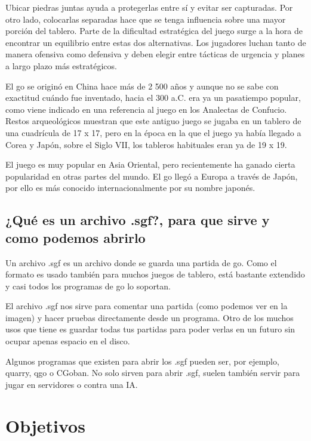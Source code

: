 \documentclass[12pt,a4paper]{report}
\begin{document}
Ubicar piedras juntas ayuda a protegerlas entre sí y evitar ser capturadas. Por
otro lado, colocarlas separadas hace que se tenga influencia sobre una mayor
porción del tablero. Parte de la dificultad estratégica del juego surge a la
hora de encontrar un equilibrio entre estas dos alternativas. Los jugadores
luchan tanto de manera ofensiva como defensiva y deben elegir entre tácticas de
urgencia y planes a largo plazo más estratégicos.

El go se originó en China hace más de 2 500 años y aunque no se sabe con
exactitud cuándo fue inventado, hacia el 300 a.C. era ya un pasatiempo popular,
como viene indicado en una referencia al juego en los Analectas de Confucio.
Restos arqueológicos muestran que este antiguo juego se jugaba en un tablero de
una cuadrícula de 17 x 17, pero en la época en la que el juego ya había llegado
a Corea y Japón, sobre el Siglo VII, los tableros habituales eran ya de 19 x 19.

El juego es muy popular en Asia Oriental, pero recientemente ha ganado cierta
popularidad en otras partes del mundo. El go llegó a Europa a través de Japón,
por ello es más conocido internacionalmente por su nombre japonés.


\section{¿Qué es un archivo .sgf?, para que sirve y como podemos abrirlo}

\label{sgf} Un archivo .sgf es un archivo donde se guarda una partida de
go. Como el formato es usado también para muchos juegos de tablero, está
bastante extendido y casi todos los programas de go lo soportan.

El archivo .sgf nos sirve para comentar una partida (como podemos ver en la
imagen) y hacer pruebas directamente desde un programa. Otro de los muchos
usos que tiene es guardar todas tus partidas para poder verlas en un futuro sin
ocupar apenas espacio en el disco. %

Algunos programas que existen para abrir los .sgf pueden ser, por ejemplo,
quarry, qgo o CGoban. No solo sirven para abrir .sgf, suelen también servir para
jugar en servidores o contra una IA. %


\chapter{Objetivos}
 
\end{document}
